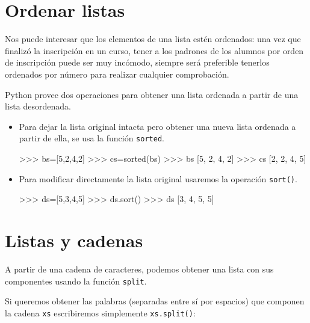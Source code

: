 

\section{Ordenar listas}

Nos puede interesar que los elementos de una lista estén ordenados: una vez
que finalizó la inscripción en un curso, tener a los padrones de los
alumnos por orden de inscripción puede ser muy incómodo, siempre será
preferible tenerlos ordenados por número para realizar cualquier
comprobación.

Python provee dos operaciones para obtener una lista ordenada a partir de
una lista desordenada.

\begin{itemize}

\item Para dejar la lista original intacta pero obtener una nueva lista
ordenada a partir de ella, se usa la función \lstinline!sorted!.

\begin{codigo-python-sn}
>>> bs=[5,2,4,2]
>>> cs=sorted(bs)
>>> bs
[5, 2, 4, 2]
>>> cs
[2, 2, 4, 5]
\end{codigo-python-sn}

\item Para modificar directamente la lista original usaremos la operación
\lstinline+sort()+.

\begin{codigo-python-sn}
>>> ds=[5,3,4,5]
>>> ds.sort()
>>> ds
[3, 4, 5, 5]
\end{codigo-python-sn}

\end{itemize}

\section{Listas y cadenas}

A partir de una cadena de caracteres, podemos obtener una lista con sus
componentes usando la función \lstinline!split!.

Si queremos obtener las palabras (separadas entre sí por espacios) que
componen la cadena \lstinline!xs! escribiremos simplemente
\lstinline!xs.split()!:

